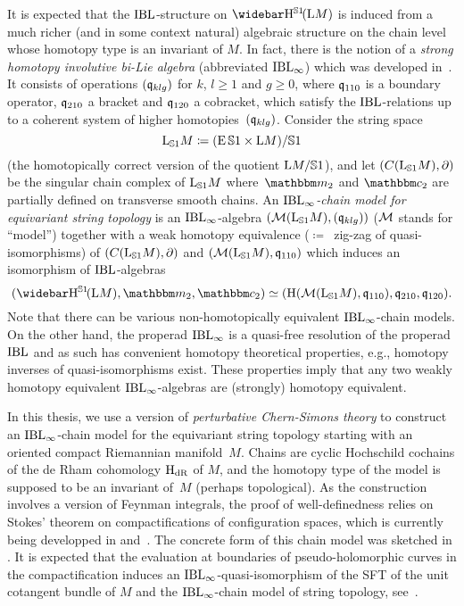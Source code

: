 \documentclass[\MainFolder/Text.tex]{subfiles}
\begin{document}
It is expected that the $\mathrm{IBL}$-structure on $\RedEquivHom(\Loop M)$ is induced from a much richer (and in some context natural) algebraic structure on the chain level whose homotopy type is an invariant of $M$. In fact, there is the notion of a \emph{strong homotopy involutive bi-Lie algebra} (abbreviated $\mathrm{IBL}_\infty$) which was developed in~\cite{Cieliebak2015}. It consists of operations $(\mathfrak{q}_{klg})$ for $k$, $l \ge 1$ and $g\ge 0$, where $\mathfrak{q}_{110}$ is a boundary operator, $\mathfrak{q}_{210}$ a bracket and $\mathfrak{q}_{120}$ a cobracket, which satisfy the $\mathrm{IBL}$-relations up to a coherent system of higher homotopies~$(\mathfrak{q}_{klg})$. Consider the string space 
$$ \mathrm{L}_{\mathbb{S}{1}} M \coloneqq (\operatorname{E}\mathbb{S}{1}\times \mathrm{L} M)/\mathbb{S}{1} $$
(the homotopically correct version of the quotient $\mathrm{L} M/\mathbb{S}{1}$), and let $(C(\mathrm{L}_{\mathbb{S}{1}} M),\partial)$ be the singular chain complex of $\mathrm{L}_{\mathbb{S}{1}} M$ where~$\StringOp_2$ and $\StringCoOp_2$ are partially defined on transverse smooth chains. An \emph{$\mathrm{IBL}_\infty$-chain model for equivariant string topology} is an $\mathrm{IBL}_\infty$-algebra $(\mathcal{M}(\mathrm{L}_{\mathbb{S}{1}} M),(\mathfrak{q}_{klg}))$ ($\mathcal{M}$ stands for ``model'') together with a weak homotopy equivalence  ($\coloneqq$~zig-zag of quasi-isomorphisms) of $(C(\mathrm{L}_{\mathbb{S}{1}} M),\partial)$ and $(\mathcal{M}(\mathrm{L}_{\mathbb{S}{1}} M),\mathfrak{q}_{110})$ which induces an isomorphism of $\mathrm{IBL}$-algebras
$$ (\RedEquivHom(\Loop M),\StringOp_2,\StringCoOp_2) \simeq (\H(\Model(\StringSpace M),\OPQ_{110}), \OPQ_{210}, \OPQ_{120}). $$
Note that there can be various non-homotopically equivalent $\mathrm{IBL}_\infty$-chain models. On the other hand, the properad $\mathrm{IBL}_\infty$ is a quasi-free resolution of the properad $\mathrm{IBL}$ and as such has convenient homotopy theoretical properties, e.g., homotopy inverses of quasi-isomorphisms exist. These properties imply that any two weakly homotopy equivalent $\mathrm{IBL}_\infty$-algebras are (strongly) homotopy equivalent.


In this thesis, we use a version of \emph{perturbative Chern-Simons theory} to construct an $\mathrm{IBL}_\infty$-chain model for the equivariant string topology starting with an oriented compact Riemannian manifold~$M$. Chains are cyclic Hochschild cochains of the de Rham cohomology $\mathrm{H}_{\mathrm{dR}}$ of $M$, and the homotopy type of the model is supposed to be an invariant of~$M$ (perhaps topological). As the construction involves a version of Feynman integrals, the proof of well-definedness relies on Stokes' theorem on compactifications of configuration spaces, which is currently being developped in \cite{Cieliebak2018} and~\cite{Cieliebak2018b}. The concrete form of this chain model was sketched in \cite{Cieliebak2015}. It is expected that the evaluation at boundaries of pseudo-holomorphic curves in the compactification induces an $\mathrm{IBL}_\infty$-quasi-isomorphism of the SFT of the unit cotangent bundle of $M$ and the $\mathrm{IBL}_\infty$-chain model of string topology, see~\cite{Cieliebak2007}.
\end{document}
